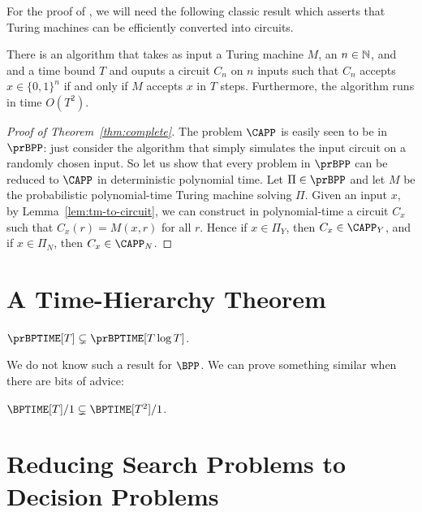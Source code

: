 For the proof of , we will need the following classic result which asserts that
Turing machines can be efficiently converted into circuits.
\begin{lemma}\label{lem:tm-to-circuit}
  There is an algorithm that takes as input a Turing machine $M$, an $n \in
  \mathbb{N}$, and and a time bound $T$ and ouputs a circuit $C_n$ on $n$ inputs
  such that $C_n$ accepts $x \in \{0, 1\}^n$ if and only if $M$ accepts
  $x$ in $T$ steps. Furthermore, the algorithm runs in time $O(T^2)$.
\end{lemma}

\begin{proof}[Proof of Theorem~\ref{thm:complete}]
  The problem $\CAPP$ is easily seen to be in $\prBPP$: just consider the
  algorithm that simply simulates the input circuit on a randomly chosen input.
  So let us show that every problem in $\prBPP$ can be reduced to $\CAPP$ in
  deterministic polynomial time. Let $\Pi \in \prBPP$ and let $M$ be the
  probabilistic polynomial-time Turing machine solving $\Pi$. Given an input
  $x$, by Lemma~\ref{lem:tm-to-circuit}, we can construct in polynomial-time a
  circuit $C_x$ such that $C_x(r) = M(x, r)$ for all $r$. Hence if $x \in
  \Pi_Y$, then $C_x \in \CAPP_Y$, and if $x \in \Pi_N$, then $C_x \in \CAPP_N$.
\end{proof}

\section{A Time-Hierarchy Theorem}

\begin{theorem}
  $\prBPTIME[T] \subsetneq \prBPTIME[T \log T]$.
\end{theorem}


We do not know such a result for $\BPP$. We can prove something similar when there are bits of advice:

\begin{proposition}
	$\BPTIME[T]/1 \subsetneq \BPTIME[T^2]/1$.
\end{proposition}


\section{Reducing Search Problems to Decision Problems}


